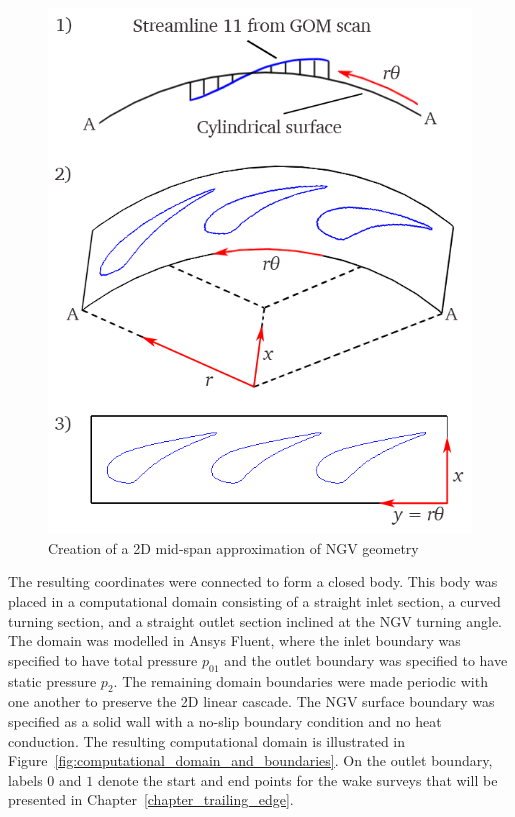 \documentclass[a4paper, 11pt, oneside]{report}
\begin{document}
\begin{figure}[H]
	\centering
	\includegraphics[width=.6\textwidth]{figs/2d_geometry_creation.png}
	\caption{Creation of a 2D mid-span approximation of NGV geometry}
	\label{fig:2d_geometry_creation}
\end{figure}

The resulting coordinates were connected to form a closed body. This body was placed in a computational domain consisting of a straight inlet section, a curved turning section, and a straight outlet section inclined at the NGV turning angle. The domain was modelled in Ansys Fluent, where the inlet boundary was specified to have total pressure $p_{01}$ and the outlet boundary was specified to have static pressure $p_2$. The remaining domain boundaries were made periodic with one another to preserve the 2D linear cascade. The NGV surface boundary was specified as a solid wall with a no-slip boundary condition and no heat conduction. The resulting computational domain is illustrated in Figure~\ref{fig:computational_domain_and_boundaries}. On the outlet boundary, labels $0$ and $1$ denote the start and end points for the wake surveys that will be presented in Chapter~\ref{chapter_trailing_edge}.
\end{document}
